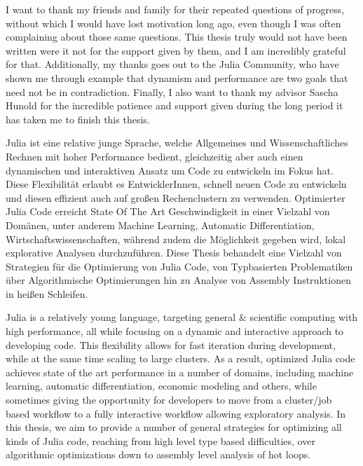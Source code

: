 \documentclass[draft,final]{vutinfth} %
\begin{document}
\frontmatter %

\addstatementpage

\begin{acknowledgements*}
I want to thank my friends and family for their repeated questions of progress, without which I would have lost motivation long ago,
even though I was often complaining about those same questions. This thesis truly would not have been written were it not for the support given by them,
and I am incredibly grateful for that.
Additionally, my thanks goes out to the Julia Community, who have shown me through example that dynamism and performance are two goals that
need not be in contradiction.
Finally, I also want to thank my advisor Sascha Hunold for the incredible patience and support given during the long period it has taken me to finish this thesis.
\end{acknowledgements*}

\begin{kurzfassung*}
Julia ist eine relative junge Sprache, welche Allgemeines und Wissenschaftliches Rechnen mit hoher Performance bedient, gleichzeitig
aber auch einen dynamischen und interaktiven Ansatz um Code zu entwickeln im Fokus hat. Diese Flexibilität erlaubt es EntwicklerInnen,
schnell neuen Code zu entwickeln und diesen effizient auch auf gro{\ss}en Rechenclustern zu verwenden. Optimierter Julia Code erreicht
State Of The Art Geschwindigkeit in einer Vielzahl von Domänen, unter anderem Machine Learning, Automatic Differentiation,
Wirtschaftswissenschaften, während zudem die Möglichkeit gegeben wird, lokal explorative Analysen durchzuführen. Diese Thesis behandelt
eine Vielzahl von Strategien für die Optimierung von Julia Code, von Typbasierten Problematiken über Algorithmische Optimierungen hin zu
Analyse von Assembly Instruktionen in hei{\ss}en Schleifen.
\end{kurzfassung*}

\begin{abstract*}
Julia is a relatively young language, targeting general \& scientific computing with high performance, all while focusing on a dynamic and
interactive approach to developing code. This flexibility allows for fast iteration during development, while at the same time scaling to
large clusters. As a result, optimized Julia code achieves state of the art performance in a number of domains, including machine
learning, automatic differentiation, economic modeling and others, while sometimes giving the opportunity for developers to move from a
cluster/job based workflow to a fully interactive workflow allowing exploratory analysis. In this thesis, we aim to provide a number of general strategies
for optimizing all kinds of Julia code, reaching from high level type based difficulties, over algorithmic optimizations down to
assembly level analysis of hot loops.
\end{abstract*}
\end{document}
